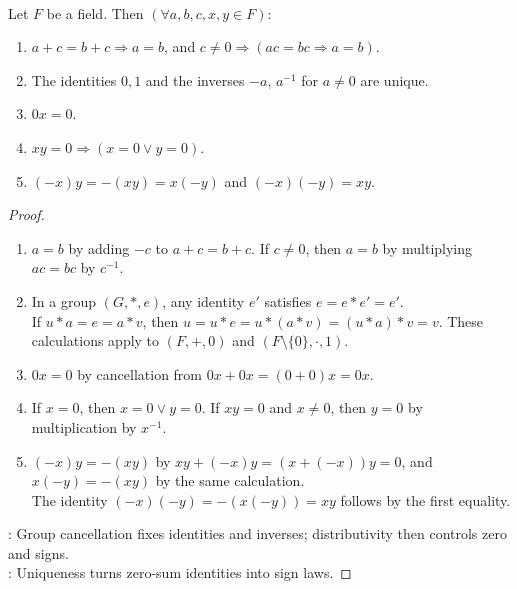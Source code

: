 \begin{proposition} \label{prop:field-axiom-consequences-analysis} \\
Let $F$ be a field. Then $(\forall a,b,c,x,y\in F)$:
\begin{enumerate}[label=(\roman*)]
\setlength{\itemsep}{0pt}
\item $a+c=b+c\Rightarrow a=b$, and $c\neq0\Rightarrow(ac=bc\Rightarrow a=b)$.
\item The identities $0,1$ and the inverses $-a$, $a^{-1}$ for $a\neq0$ are unique.
\item $0x=0$.
\item $xy=0\Rightarrow(x=0\lor y=0)$.
\item $(-x)y=-(xy)=x(-y)$ and $(-x)(-y)=xy$.
\end{enumerate}
\begin{proof}
\begin{enumerate}[label=(\roman*)]
\setlength{\itemsep}{0pt}
\item $a=b$ by adding $-c$ to $a+c=b+c$. If $c\neq0$, then $a=b$ by multiplying $ac=bc$ by $c^{-1}$.
\item In a group $(G,\ast,e)$, any identity $e'$ satisfies $e=e\ast e'=e'$.\\
If $u\ast a=e=a\ast v$, then $u=u\ast e=u\ast(a\ast v)=(u\ast a)\ast v=v$. These calculations apply to $(F,+,0)$ and $(F\setminus\{0\},\cdot,1)$.
\item $0x=0$ by cancellation from $0x+0x=(0+0)x=0x$.
\item If $x=0$, then $x=0\lor y=0$. If $xy=0$ and $x\neq0$, then $y=0$ by multiplication by $x^{-1}$.
\item $(-x)y=-(xy)$ by $xy+(-x)y=(x+(-x))y=0$, and $x(-y)=-(xy)$ by the same calculation.\\
The identity $(-x)(-y)=-(x(-y))=xy$ follows by the first equality.
\end{enumerate}
: Group cancellation fixes identities and inverses; distributivity then controls zero and signs.\\
: Uniqueness turns zero-sum identities into sign laws.
\end{proof}
\end{proposition}

